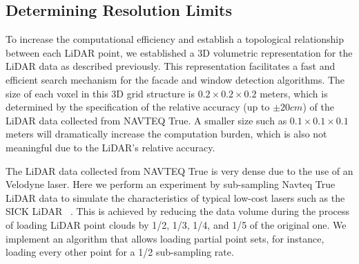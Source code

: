
\subsection{Determining Resolution Limits}  

To increase the computational efficiency and establish a topological relationship between each LiDAR point, we  established a 3D volumetric representation for the LiDAR data as described previously. This representation  facilitates a fast and efficient search mechanism for the facade and window detection algorithms. The size of each voxel in this 3D grid structure is $0.2\times0.2\times 0.2$ meters, which is determined by the specification of the relative accuracy (up to $\pm 20 cm$) of the LiDAR data collected from NAVTEQ True. A smaller size such as $0.1\times0.1\times 0.1$ meters will dramatically increase the computation burden, which is also not meaningful due to the LiDAR's relative accuracy.

The LiDAR data collected from NAVTEQ True is very dense due to the use of an Velodyne laser. Here we perform an experiment by sub-sampling Navteq True LiDAR data to simulate the characteristics of typical low-cost lasers such as the SICK LiDAR ~\cite {sick-url}. This is achieved by reducing the data volume during the process of loading LiDAR point clouds by 1/2, 1/3, 1/4, and 1/5 of the original one. We implement an algorithm that allows loading partial point sets, for instance, loading every other point for a 1/2 sub-sampling rate. 

